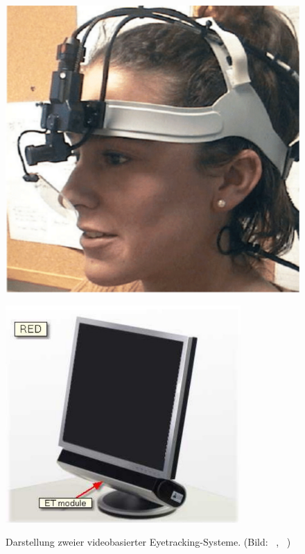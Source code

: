 \begin{figure}[ht]
   \begin{minipage}[t]{0.5\linewidth} 
      \centering 
      \includegraphics[width=.7\textwidth]{bilder/grundlagen/HDM.png}
     \label{fig:eyeTrackingsub1}
   \end{minipage}%
   \hfill
   \begin{minipage}[t]{0.5\linewidth} 
      \centering 
      \includegraphics[width=0.8\textwidth]{bilder/implementierung/Eye3.JPG}
   \label{fig:eyeTrackingsub2}
   \end{minipage}%
    \hfill
   \caption{Darstellung zweier videobasierter Eyetracking-Systeme. (Bild: \textbf{}~\cite{Goldberg2003}, \textbf{}~\cite[S.136]{SMI2011})}\label{fig:device} 
\end{figure} 

